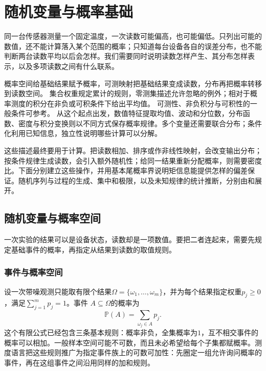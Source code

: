 \chapter{随机变量与概率基础}
\label{chap:random-variables}
\label{chap:probability-theory}

同一台传感器测量一个固定温度，一次读数可能偏高，也可能偏低。只列出可能的数值，还不能计算落入某个范围的概率；只知道每台设备各自的误差分布，也不能判断两台读数平均以后会怎样。我们需要同时说明读数怎样产生、其分布怎样表示，以及多项读数之间有什么联系。

概率空间给基础结果赋予概率，可测映射把基础结果变成读数，分布再把概率转移到读数空间。
集合权重规定累计的规则，零测集描述允许忽略的例外；相对于概率测度的积分在非负或可积条件下给出平均值。
可测性、非负积分与可积性的一般条件可参考。
从这个起点出发，数值特征提取均值、波动和分位数，分布函数、密度与积分变换则以不同方式保存概率规律。多个变量还需要联合分布；条件化利用已知信息，独立性说明哪些计算可以分解。

这些描述最终要用于计算。把读数相加、排序或作非线性映射，会改变输出分布；按条件规律生成读数，会引入额外随机性；给同一结果重新分配概率，则需要密度比。下面分别建立这些操作，并用基本尾概率界说明矩信息能提供怎样的偏差保证。随机序列与过程的生成、集中和极限，以及未知规律的统计推断，分别由和展开。

\section{随机变量与概率空间}
\label{sec:rv-definition}
\label{sec:probability-representation-conditioning}
一次实验的结果可以是设备状态，读数却是一项数值。要把二者连起来，需要先规定基础事件的概率，再指定从结果到读数的取值规则。

\subsection{事件与概率空间}
\label{sec:probability-spaces-random-variables}
设一次带噪观测只能取有限个结果\(\Omega=\{\omega_1,\ldots,\omega_m\}\)，并为每个结果指定权重\(p_j\geq0\)，满足\(\sum_{j=1}^{m}p_j=1\)。事件
\(A\subseteq\Omega\)的概率为
\[ \mathbb{P}(A)=\sum_{\omega_j\in A}p_j. \]
这个有限公式已经包含三条基本规则：概率非负，全集概率为\(1\)，互不相交事件的概率可以相加。一般样本空间可能不可数，而且未必希望给每个子集都赋概率。测度语言把这些规则推广为指定事件族上的可数可加性：先圈定一组允许询问概率的事件，再在这组事件之间沿用同样的加和规则。

